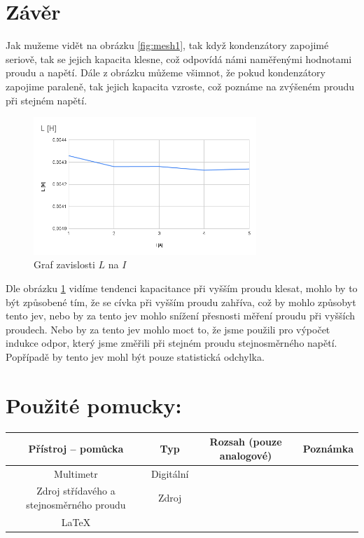 \documentclass[a4paper]{article}
\begin{document}
\section*{Závěr}
Jak mužeme vidět na obrázku \ref{fig:mesh1}, tak když kondenzátory zapojimé seriově, tak se jejich kapacita klesne, což odpovídá námi naměřenými hodnotami proudu a napětí. Dále z obrázku můžeme všimnot, že pokud kondenzátory zapojime paraleně, tak jejich kapacita vzroste, což poznáme na zvýšeném proudu při stejném napětí.\\
\begin{figure}[H]
	\centering
	\includegraphics[width=0.75\textwidth]{Lmereni.png}
	\caption{Graf zavislosti $L$ na $I$}
	\label{fig:mesh2}
\end{figure}
Dle obrázku \ref{fig:mesh2} vidíme tendenci kapacitance při vyšším proudu klesat, mohlo by to být způsobené tím, že se cívka při vyšším proudu zahříva, což by mohlo způsobyt tento jev, nebo by za tento jev mohlo snížení přesnosti měření proudu při vyšších proudech. Nebo by za tento jev mohlo moct to, že jsme použili pro výpočet indukce odpor, který jsme změřili při stejném proudu stejnosměrného napětí. Popřípadě by tento jev mohl být pouze statistická odchylka.


\section*{Použité pomucky:}
\begin{tabularx}{\linewidth}{c|c|c|c}
	Přístroj – pomůcka & Typ & Rozsah (pouze analogové)
	& Poznámka \\
	\hline
	Multimetr & Digit\'{a}ln\'{i} &	& \\
	Zdroj st\v{r}\'{i}dav\'{e}ho a stejnosm\v{e}rn\'{e}ho proudu & Zdroj & & \\
	\LaTeX & & & \\
\end{tabularx}
\end{document}
